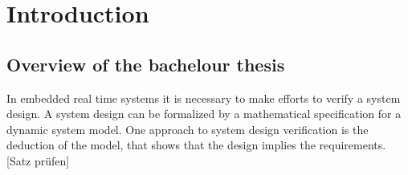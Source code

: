 






\chapter{Introduction}  %

\ifpdf
    \graphicspath{{Chapter1/Figs/Raster/}{Chapter1/Figs/PDF/}{Chapter1/Figs/}}
\else
    \graphicspath{{Chapter1/Figs/Vector/}{Chapter1/Figs/}}
\fi


\section{Overview of the bachelour thesis } %

In embedded real time systems it is necessary to make efforts to verify a system design.
A system design can be formalized by a mathematical specification for a dynamic system model.
One approach to system design verification is the deduction of the model, that shows that the design implies the requirements. [Satz prüfen] 

